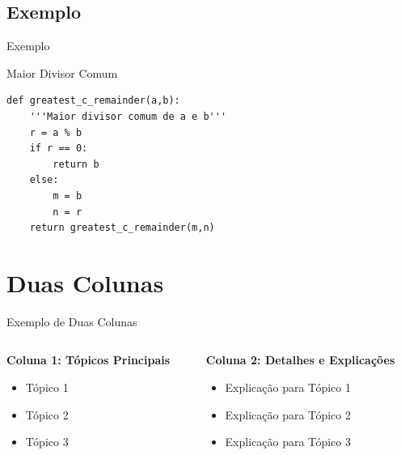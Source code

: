 \subsection{Exemplo}
\begin{frame}[fragile]{Exemplo}
    \begin{block}{Maior Divisor Comum}
        \begin{lstlisting}[firstnumber=1, label=glabels, xleftmargin=10pt] 
def greatest_c_remainder(a,b):
    '''Maior divisor comum de a e b'''
    r = a % b
    if r == 0:
        return b
    else:
        m = b
        n = r
    return greatest_c_remainder(m,n)
        \end{lstlisting}
    \end{block}
\end{frame}

\section{Duas Colunas}
\begin{frame}{Exemplo de Duas Colunas}
    \begin{columns}[t] %
        \begin{column}{0.48\textwidth} %
            \textbf{Coluna 1: Tópicos Principais}
            \begin{itemize}
                \item Tópico 1
                \item Tópico 2
                \item Tópico 3
            \end{itemize}
        \end{column}
        \begin{column}{0.48\textwidth} %
            \textbf{Coluna 2: Detalhes e Explicações}
            \begin{itemize}
                \item Explicação para Tópico 1
                \item Explicação para Tópico 2
                \item Explicação para Tópico 3
            \end{itemize}
        \end{column}
    \end{columns}
\end{frame}

